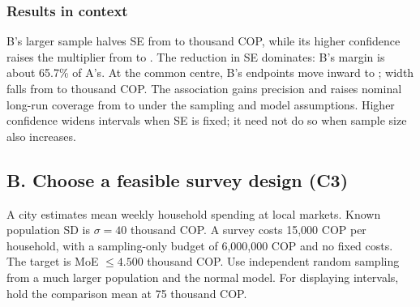 \begin{landscape}
\subsubsection*{Results in context}
B's larger sample halves SE from  to  thousand COP, while its higher confidence raises the multiplier from  to . The reduction in SE dominates: B's margin is about 65.7\% of A's. At the common  centre, B's endpoints move inward to ; width falls from  to  thousand COP. The association gains precision and raises nominal long-run coverage from  to  under the sampling and model assumptions. Higher confidence widens intervals when SE is fixed; it need not do so when sample size also increases.

\end{landscape}
\clearpage
\subsection{B. Choose a feasible survey design (C3)}\label{prob:c3-5}
A city estimates mean weekly household spending at local markets. Known population SD is $\sigma=40$ thousand COP. A survey costs 15,000 COP per household, with a sampling-only budget of 6,000,000 COP and no fixed costs. The target is MoE $\le4.500$ thousand COP. Use independent random sampling from a much larger population and the normal model. For displaying intervals, hold the comparison mean at 75 thousand COP.
